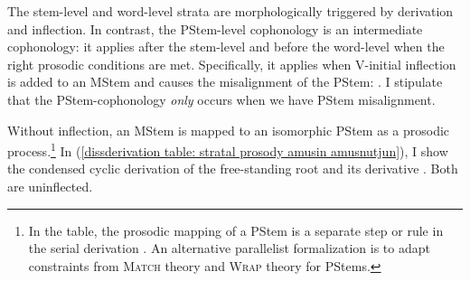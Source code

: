The stem-level and word-level strata are morphologically triggered by derivation and inflection. In contrast, the PStem-level cophonology is an intermediate cophonology: it applies after the stem-level and before the word-level when the right prosodic conditions are met. Specifically, it applies when V-initial inflection is added to an MStem and causes the misalignment of the PStem: \textit{}. I stipulate that the PStem-cophonology \textit{only} occurs when we have PStem misalignment. 

Without inflection, an MStem is mapped to an isomorphic   PStem as a prosodic process.\footnote{In the table, the prosodic mapping of a PStem is    a separate step or rule in the serial derivation   \citep[cf.][]{Selkirk-1980-ProsodicDomainSanskrit,Nespor-Vogel-1986-ProsodicPhon,Selkirk-1986-DerivedDomains,Gunes-2015-TurkishDerivingProsody}. An alternative parallelist formalization is to adapt constraints from   \textsc{Match} theory and \textsc{Wrap} theory \citep{Selkirk-2011-SyntaxPhonoInterface,Truckenbrodt-1999-RelationSyntaxPhonologyWRAP,Guekguezian-2017-ProsodicRecursionCyclicityWord,Guekguezian-2017-TemplatesInteractionRecursionWordProsodic} for PStems. }  In (\ref{dissderivation table: stratal prosody amusin amusnutjun}), I show the condensed cyclic derivation of the free-standing root \textit{}   and its derivative  \textit{}. Both are uninflected. 




	
		
	
